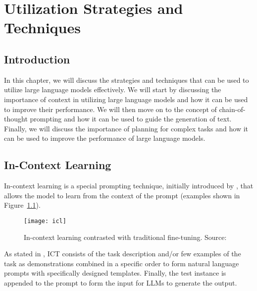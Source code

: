 
\chapter{Utilization Strategies and Techniques}
\label{ch:utilization}

\section{Introduction}
\label{sec:ch4-introduction}

In this chapter, we will discuss the strategies and techniques that can be used to utilize large language models effectively.
We will start by discussing the importance of context in utilizing large language models and how it can be used to improve their performance.
We will then move on to the concept of chain-of-thought prompting and how it can be used to guide the generation of text.
Finally, we will discuss the importance of planning for complex tasks and how it can be used to improve the performance of large language models.

\section{In-Context Learning}
\label{sec:in-context-learning}
In-context learning is a special prompting technique, initially introduced by \textcite{brown2020language}, that allows the model to learn from the context of the prompt (examples shown in Figure~\ref{fig:in-context-learning}).
\begin{figure}[h!]
	\centering
	\texttt{[image: icl]}
	\caption{In-context learning contrasted with traditional fine-tuning. Source: \textcite{brown2020language}}
	\label{fig:in-context-learning}
\end{figure}
As stated in \textcite{brown2020language}, ICT consists of the task description and/or few examples of the task as demonstrations combined in a specific order to form natural language prompts with specifically designed templates.
Finally, the test instance is appended to the prompt to form the input for LLMs to generate the output.

